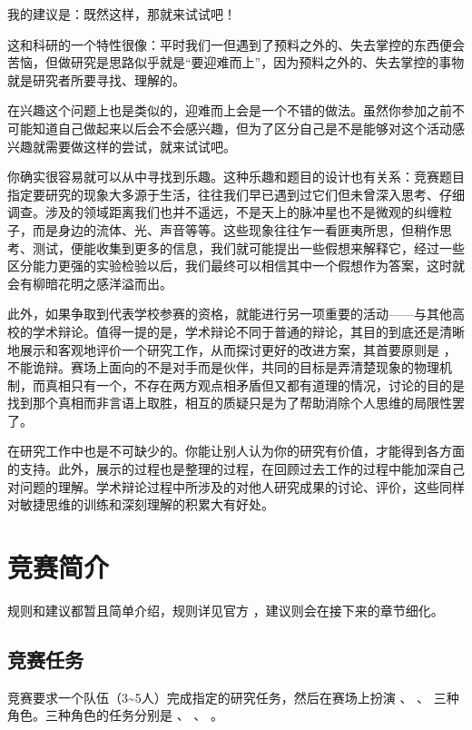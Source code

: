 \documentclass[a4paper,10pt,english]{sphinxmanual}
\begin{document}
我的建议是：既然这样，那就来试试吧！

这和科研的一个特性很像：平时我们一但遇到了预料之外的、失去掌控的东西便会苦恼，但做研究是思路似乎就是“要迎难而上”，因为预料之外的、失去掌控的事物就是研究者所要寻找、理解的。

在兴趣这个问题上也是类似的，迎难而上会是一个不错的做法。虽然你参加之前不可能知道自己做起来以后会不会感兴趣，但为了区分自己是不是能够对这个活动感兴趣就需要做这样的尝试，就来试试吧。

你确实很容易就可以从中寻找到乐趣。这种乐趣和题目的设计也有关系：竞赛题目指定要研究的现象大多源于生活，往往我们早已遇到过它们但未曾深入思考、仔细调查。涉及的领域距离我们也并不遥远，不是天上的脉冲星也不是微观的纠缠粒子，而是身边的流体、光、声音等等。这些现象往往乍一看匪夷所思，但稍作思考、测试，便能收集到更多的信息，我们就可能提出一些假想来解释它，经过一些区分能力更强的实验检验以后，我们最终可以相信其中一个假想作为答案，这时就会有柳暗花明之感洋溢而出。

此外，如果争取到代表学校参赛的资格，就能进行另一项重要的活动——与其他高校的学术辩论。值得一提的是，学术辩论不同于普通的辩论，其目的到底还是清晰地展示和客观地评价一个研究工作，从而探讨更好的改进方案，其首要原则是  ，不能诡辩。赛场上面向的不是对手而是伙伴，共同的目标是弄清楚现象的物理机制，而真相只有一个，不存在两方观点相矛盾但又都有道理的情况，讨论的目的是找到那个真相而非言语上取胜，相互的质疑只是为了帮助消除个人思维的局限性罢了。

 在研究工作中也是不可缺少的。你能让别人认为你的研究有价值，才能得到各方面的支持。此外，展示的过程也是整理的过程，在回顾过去工作的过程中能加深自己对问题的理解。学术辩论过程中所涉及的对他人研究成果的讨论、评价，这些同样对敏捷思维的训练和深刻理解的积累大有好处。


\chapter{竞赛简介}
\label{\detokenize{2. Intro_Tournament::doc}}\label{\detokenize{2. Intro_Tournament:id1}}
规则和建议都暂且简单介绍，规则详见官方  ，建议则会在接下来的章节细化。


\section{竞赛任务}
\label{\detokenize{2. Intro_Tournament:id2}}
竞赛要求一个队伍（3\textasciitilde{}5人）完成指定的研究任务，然后在赛场上扮演  、  、  三种角色。三种角色的任务分别是  、  、  。
\end{document}
